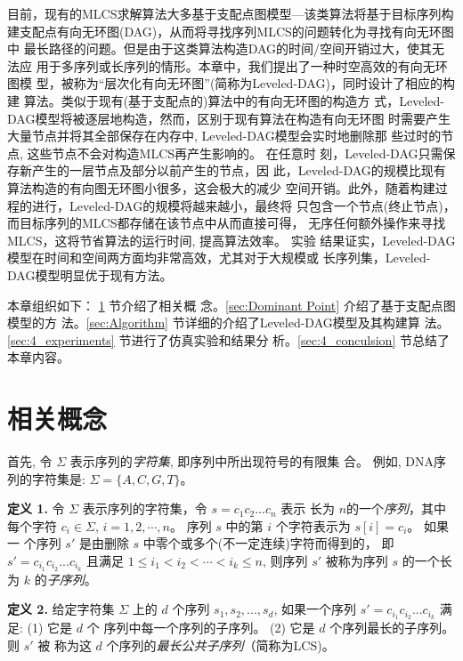 目前，现有的MLCS求解算法大多基于支配点图模型---该类算法将基于目标序列构
建支配点有向无环图(DAG)，从而将寻找序列MLCS的问题转化为寻找有向无环图中
最长路径的问题。但是由于这类算法构造DAG的时间/空间开销过大，使其无法应
用于多序列或长序列的情形。本章中，我们提出了一种时空高效的有向无环图模
型，被称为“层次化有向无环图”(简称为Leveled-DAG)，同时设计了相应的构建
算法。类似于现有(基于支配点的)算法中的有向无环图的构造方
式，Leveled-DAG模型将被逐层地构造，然而，区别于现有算法在构造有向无环图
时需要产生大量节点并将其全部保存在内存中, Leveled-DAG模型会实时地删除那
些过时的节点, 这些节点不会对构造MLCS再产生影响的。 在任意时
刻，Leveled-DAG只需保存新产生的一层节点及部分以前产生的节点，因
此，Leveled-DAG的规模比现有算法构造的有向图无环图小很多，这会极大的减少
空间开销。此外，随着构建过程的进行，Leveled-DAG的规模将越来越小，最终将
只包含一个节点(终止节点)，而目标序列的MLCS都存储在该节点中从而直接可得，
无序任何额外操作来寻找MLCS，这将节省算法的运行时间, 提高算法效率。 实验
结果证实，Leveled-DAG模型在时间和空间两方面均非常高效，尤其对于大规模或
长序列集，Leveled-DAG模型明显优于现有方法。

本章组织如下： \ref{sec:4_Notations} 节介绍了相关概
念。\ref{sec:Dominant Point} 介绍了基于支配点图模型的方
法。\ref{sec:Algorithm} 节详细的介绍了Leveled-DAG模型及其构建算
法。\ref{sec:4_experiments} 节进行了仿真实验和结果分
析。\ref{sec:4_conculsion} 节总结了本章内容。

\section{相关概念}
\label{sec:4_Notations}

首先, 令 $\Sigma$ 表示序列的\emph{字符集}, 即序列中所出现符号的有限集
合。 例如, DNA序列的字符集是: $\Sigma=\{A, C, G, T\}$。

\textbf{定义 1.} 令 $\Sigma$ 表示序列的字符集，令 $s=c_1c_2...c_n$ 表示
长为 $n$的一个\emph{序列}，其中每个字符 $c_i\in\Sigma$,
$i=1,2,\cdots,n$。 序列 $s$ 中的第 $i$ 个字符表示为 $s[i]=c_i$。 如果一
个序列 $s'$ 是由删除 $s$ 中零个或多个(不一定连续)字符而得到的，
即 $s'=c_{i_1}c_{i_2}...c_{i_k}$ 且满足
$1 \leq i_1<i_2<\cdots<i_k \leq n$, 则序列 $s'$ 被称为序列 $s$ 的一个长
为 $k$ 的\emph{子序列}。

\textbf{定义 2.} 给定字符集 $\Sigma$ 上的 $d$ 个序列 $s_1, s_2, ...,
s_d$, 如果一个序列 $s'=c_{i_1}c_{i_2}...c_{i_k}$ 满足: (1) 它是 $d$ 个
序列中每一个序列的子序列。 (2) 它是 $d$ 个序列最长的子序列。 则 $s'$ 被
称为这 $d$ 个序列的\emph{最长公共子序列}（简称为LCS)。

